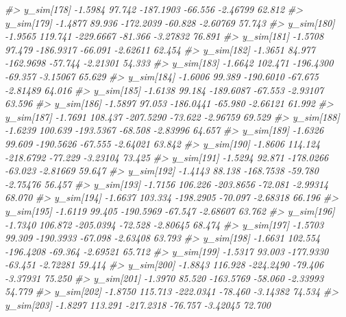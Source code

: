 \documentclass[
  10pt,
  italian,
  a4paper,
  extrafontsizes,onecolumn,openright
  ]{memoir}
\newenvironment{Shaded}{\begin{snugshade}}{\end{snugshade}}
\newcommand{\CommentTok}[1]{\textcolor[rgb]{0.56,0.35,0.01}{\textit{#1}}}
\begin{document}
\begin{Shaded}
\begin{Highlighting}[]
\CommentTok{\#\textgreater{}   y\_sim[178] {-}1.5984  97.742 {-}187.1903 {-}66.556 {-}2.46799 62.812}
\CommentTok{\#\textgreater{}   y\_sim[179] {-}1.4877  89.936 {-}172.2039 {-}60.828 {-}2.60769 57.743}
\CommentTok{\#\textgreater{}   y\_sim[180] {-}1.9565 119.741 {-}229.6667 {-}81.366 {-}3.27832 76.891}
\CommentTok{\#\textgreater{}   y\_sim[181] {-}1.5708  97.479 {-}186.9317 {-}66.091 {-}2.62611 62.454}
\CommentTok{\#\textgreater{}   y\_sim[182] {-}1.3651  84.977 {-}162.9698 {-}57.744 {-}2.21301 54.333}
\CommentTok{\#\textgreater{}   y\_sim[183] {-}1.6642 102.471 {-}196.4300 {-}69.357 {-}3.15067 65.629}
\CommentTok{\#\textgreater{}   y\_sim[184] {-}1.6006  99.389 {-}190.6010 {-}67.675 {-}2.81489 64.016}
\CommentTok{\#\textgreater{}   y\_sim[185] {-}1.6138  99.184 {-}189.6087 {-}67.553 {-}2.93107 63.596}
\CommentTok{\#\textgreater{}   y\_sim[186] {-}1.5897  97.053 {-}186.0441 {-}65.980 {-}2.66121 61.992}
\CommentTok{\#\textgreater{}   y\_sim[187] {-}1.7691 108.437 {-}207.5290 {-}73.622 {-}2.96759 69.529}
\CommentTok{\#\textgreater{}   y\_sim[188] {-}1.6239 100.639 {-}193.5367 {-}68.508 {-}2.83996 64.657}
\CommentTok{\#\textgreater{}   y\_sim[189] {-}1.6326  99.609 {-}190.5626 {-}67.555 {-}2.64021 63.842}
\CommentTok{\#\textgreater{}   y\_sim[190] {-}1.8606 114.124 {-}218.6792 {-}77.229 {-}3.23104 73.425}
\CommentTok{\#\textgreater{}   y\_sim[191] {-}1.5294  92.871 {-}178.0266 {-}63.023 {-}2.81669 59.647}
\CommentTok{\#\textgreater{}   y\_sim[192] {-}1.4143  88.138 {-}168.7538 {-}59.780 {-}2.75476 56.457}
\CommentTok{\#\textgreater{}   y\_sim[193] {-}1.7156 106.226 {-}203.8656 {-}72.081 {-}2.99314 68.070}
\CommentTok{\#\textgreater{}   y\_sim[194] {-}1.6637 103.334 {-}198.2905 {-}70.097 {-}2.68318 66.196}
\CommentTok{\#\textgreater{}   y\_sim[195] {-}1.6119  99.405 {-}190.5969 {-}67.547 {-}2.68607 63.762}
\CommentTok{\#\textgreater{}   y\_sim[196] {-}1.7340 106.872 {-}205.0394 {-}72.528 {-}2.80645 68.474}
\CommentTok{\#\textgreater{}   y\_sim[197] {-}1.5703  99.309 {-}190.3933 {-}67.098 {-}2.63408 63.793}
\CommentTok{\#\textgreater{}   y\_sim[198] {-}1.6631 102.554 {-}196.4208 {-}69.364 {-}2.69521 65.712}
\CommentTok{\#\textgreater{}   y\_sim[199] {-}1.5317  93.003 {-}177.9330 {-}63.451 {-}2.72281 59.414}
\CommentTok{\#\textgreater{}   y\_sim[200] {-}1.8843 116.928 {-}224.2490 {-}79.406 {-}3.37931 75.250}
\CommentTok{\#\textgreater{}   y\_sim[201] {-}1.3970  85.520 {-}163.5769 {-}58.060 {-}2.33993 54.779}
\CommentTok{\#\textgreater{}   y\_sim[202] {-}1.8750 115.713 {-}222.0341 {-}78.460 {-}3.14382 74.534}
\CommentTok{\#\textgreater{}   y\_sim[203] {-}1.8297 113.291 {-}217.2318 {-}76.757 {-}3.42045 72.700}

\end{Highlighting}
\end{Shaded}
\end{document}
